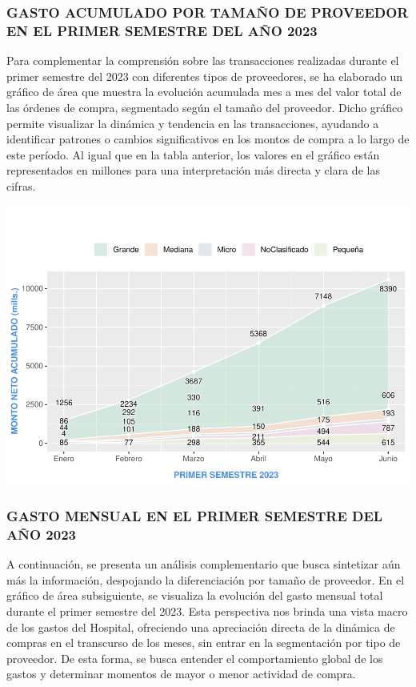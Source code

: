 \documentclass[
]{article}
\begin{document}
\hypertarget{gasto-acumulado-por-tamauxf1o-de-proveedor-en-el-primer-semestre-del-auxf1o-2023}{%
\subsubsection{GASTO ACUMULADO POR TAMAÑO DE PROVEEDOR EN EL PRIMER
SEMESTRE DEL AÑO
2023}\label{gasto-acumulado-por-tamauxf1o-de-proveedor-en-el-primer-semestre-del-auxf1o-2023}}

Para complementar la comprensión sobre las transacciones realizadas
durante el primer semestre del 2023 con diferentes tipos de proveedores,
se ha elaborado un gráfico de área que muestra la evolución acumulada
mes a mes del valor total de las órdenes de compra, segmentado según el
tamaño del proveedor. Dicho gráfico permite visualizar la dinámica y
tendencia en las transacciones, ayudando a identificar patrones o
cambios significativos en los montos de compra a lo largo de este
período. Al igual que en la tabla anterior, los valores en el gráfico
están representados en millones para una interpretación más directa y
clara de las cifras.

\includegraphics{GastoPrimerSemestre2023_files/figure-latex/grafico-acumulado-1.pdf}
\newpage

\hypertarget{gasto-mensual-en-el-primer-semestre-del-auxf1o-2023}{%
\subsubsection{GASTO MENSUAL EN EL PRIMER SEMESTRE DEL AÑO
2023}\label{gasto-mensual-en-el-primer-semestre-del-auxf1o-2023}}

A continuación, se presenta un análisis complementario que busca
sintetizar aún más la información, despojando la diferenciación por
tamaño de proveedor. En el gráfico de área subsiguiente, se visualiza la
evolución del gasto mensual total durante el primer semestre del 2023.
Esta perspectiva nos brinda una vista macro de los gastos del Hospital,
ofreciendo una apreciación directa de la dinámica de compras en el
transcurso de los meses, sin entrar en la segmentación por tipo de
proveedor. De esta forma, se busca entender el comportamiento global de
los gastos y determinar momentos de mayor o menor actividad de compra.
\end{document}
